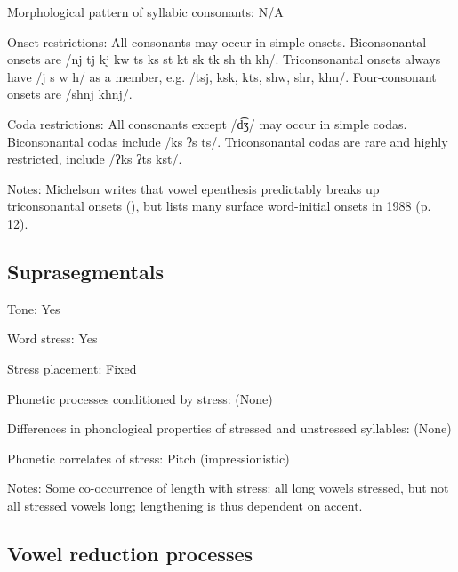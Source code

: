{\begin{appendixdesc}
\item[Morphological pattern of syllabic consonants:] N/A

\item[Onset restrictions:] All consonants may occur in simple onsets. Biconsonantal onsets are /nj tj kj kw ts ks st kt sk tk sh th kh/. Triconsonantal onsets always have /j s w h/ as a member, e.g. /tsj, ksk, kts, shw, shr, khn/. Four-consonant onsets are /shnj khnj/.

\item[Coda restrictions:] All consonants except /d͡ʒ/ may occur in simple codas. Biconsonantal codas include /ks ʔs ts/. Triconsonantal codas are rare and highly restricted, include /ʔks ʔts kst/.

\item[Notes:] Michelson writes that vowel epenthesis predictably breaks up triconsonantal onsets (\citeyear{Michelson1981}), but lists many surface word-initial onsets in 1988 (p. 12).
\end{appendixdesc}
\subsection*{Suprasegmentals}
\begin{appendixdesc}
\item[Tone:] Yes

\item[Word stress:] Yes

\item[Stress placement:] Fixed

\item[Phonetic processes conditioned by stress:] (None)

\item[Differences in phonological properties of stressed and unstressed syllables:] (None)

\item[Phonetic correlates of stress:] Pitch (impressionistic)

\item[Notes:] Some co-occurrence of length with stress: all long vowels stressed, but not all stressed vowels long; lengthening is thus dependent on accent.
\end{appendixdesc}
\subsection*{Vowel reduction processes}
\begin{appendixdesc}


\end{appendixdesc}}
